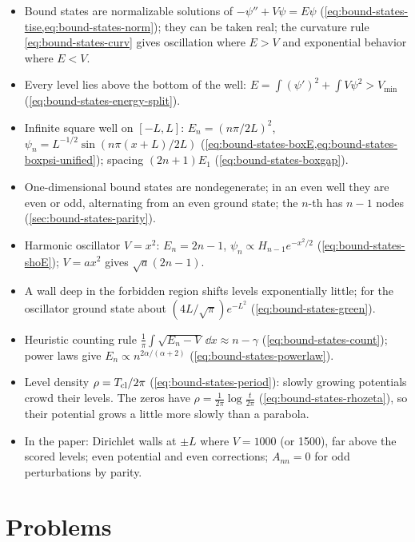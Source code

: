 \begin{itemize}
\item Bound states are normalizable solutions of $-\psi''+V\psi=E\psi$ (\cref{eq:bound-states-tise,eq:bound-states-norm}); they can be taken real; the curvature rule \cref{eq:bound-states-curv} gives oscillation where $E>V$ and exponential behavior where $E<V$.
\item Every level lies above the bottom of the well: $E=\int(\psi')^2+\int V\psi^2>V_{\min}$ (\cref{eq:bound-states-energy-split}).
\item Infinite square well on $[-L,L]$: $E_n=(n\pi/2L)^2$, $\psi_n=L^{-1/2}\sin(n\pi(x+L)/2L)$ (\cref{eq:bound-states-boxE,eq:bound-states-boxpsi-unified}); spacing $(2n+1)E_1$ (\cref{eq:bound-states-boxgap}).
\item One-dimensional bound states are nondegenerate; in an even well they are even or odd, alternating from an even ground state; the $n$-th has $n-1$ nodes (\cref{sec:bound-states-parity}).
\item Harmonic oscillator $V=x^2$: $E_n=2n-1$, $\psi_n\propto H_{n-1}e^{-x^2/2}$ (\cref{eq:bound-states-shoE}); $V=ax^2$ gives $\sqrt a(2n-1)$.
\item A wall deep in the forbidden region shifts levels exponentially little; for the oscillator ground state about $(4L/\sqrt\pi)e^{-L^2}$ (\cref{eq:bound-states-green}).
\item Heuristic counting rule $\frac1\pi\int\sqrt{E_n-V}\,\dd x\approx n-\gamma$ (\cref{eq:bound-states-count}); power laws give $E_n\propto n^{2\alpha/(\alpha+2)}$ (\cref{eq:bound-states-powerlaw}).
\item Level density $\rho=T_{\rm cl}/2\pi$ (\cref{eq:bound-states-period}): slowly growing potentials crowd their levels. The zeros have $\rho=\frac1{2\pi}\log\frac t{2\pi}$ (\cref{eq:bound-states-rhozeta}), so their potential grows a little more slowly than a parabola.
\item In the paper: Dirichlet walls at $\pm L$ where $V=1000$ (or 1500), far above the scored levels; even potential and even corrections; $A_{nn}=0$ for odd perturbations by parity.
\end{itemize}

\section{Problems}\label{sec:bound-states-problems}

